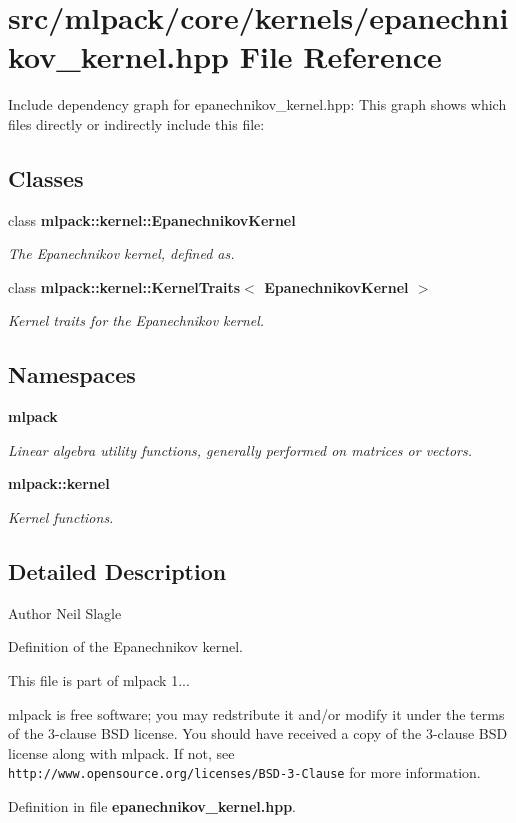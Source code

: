 \section{src/mlpack/core/kernels/epanechnikov\-\_\-kernel.hpp File Reference}
\label{epanechnikov__kernel_8hpp}
Include dependency graph for epanechnikov\-\_\-kernel.\-hpp\-:
This graph shows which files directly or indirectly include this file\-:
\subsection*{Classes}
\begin{DoxyCompactItemize}
\item 
class {\bf mlpack\-::kernel\-::\-Epanechnikov\-Kernel}
\begin{DoxyCompactList}\small\item\em The Epanechnikov kernel, defined as. \end{DoxyCompactList}\item 
class {\bf mlpack\-::kernel\-::\-Kernel\-Traits$<$ Epanechnikov\-Kernel $>$}
\begin{DoxyCompactList}\small\item\em Kernel traits for the Epanechnikov kernel. \end{DoxyCompactList}\end{DoxyCompactItemize}
\subsection*{Namespaces}
\begin{DoxyCompactItemize}
\item 
{\bf mlpack}
\begin{DoxyCompactList}\small\item\em Linear algebra utility functions, generally performed on matrices or vectors. \end{DoxyCompactList}\item 
{\bf mlpack\-::kernel}
\begin{DoxyCompactList}\small\item\em Kernel functions. \end{DoxyCompactList}\end{DoxyCompactItemize}


\subsection{Detailed Description}
\begin{DoxyAuthor}{Author}
Neil Slagle
\end{DoxyAuthor}
Definition of the Epanechnikov kernel.

This file is part of mlpack 1...

mlpack is free software; you may redstribute it and/or modify it under the terms of the 3-\/clause B\-S\-D license. You should have received a copy of the 3-\/clause B\-S\-D license along with mlpack. If not, see {\tt http\-://www.\-opensource.\-org/licenses/\-B\-S\-D-\/3-\/\-Clause} for more information. 

Definition in file {\bf epanechnikov\-\_\-kernel.\-hpp}.

